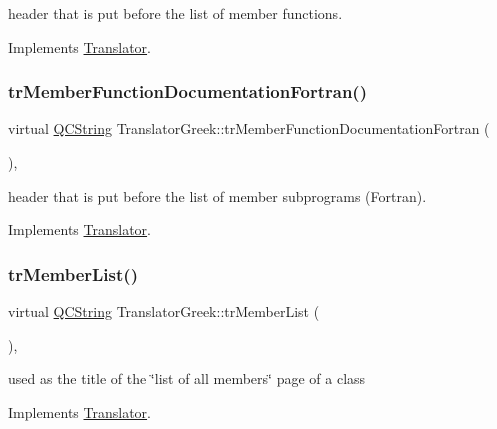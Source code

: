 header that is put before the list of member functions. 

Implements \mbox{\hyperlink{class_translator}{Translator}}.

\mbox{\label{class_translator_greek_a40aa92ad0e860be1ca884aedfcbc7af7}} 
\subsubsection{\texorpdfstring{trMemberFunctionDocumentationFortran()}{trMemberFunctionDocumentationFortran()}}
{\footnotesize\ttfamily virtual \mbox{\hyperlink{class_q_c_string}{Q\+C\+String}} Translator\+Greek\+::tr\+Member\+Function\+Documentation\+Fortran (\begin{DoxyParamCaption}{ }\end{DoxyParamCaption})\hspace{0.3cm}{\ttfamily [inline]}, {\ttfamily [virtual]}}

header that is put before the list of member subprograms (Fortran). 

Implements \mbox{\hyperlink{class_translator}{Translator}}.

\mbox{\label{class_translator_greek_a643d5a68f002a17ff0a0e8d977e301eb}} 
\subsubsection{\texorpdfstring{trMemberList()}{trMemberList()}}
{\footnotesize\ttfamily virtual \mbox{\hyperlink{class_q_c_string}{Q\+C\+String}} Translator\+Greek\+::tr\+Member\+List (\begin{DoxyParamCaption}{ }\end{DoxyParamCaption})\hspace{0.3cm}{\ttfamily [inline]}, {\ttfamily [virtual]}}

used as the title of the \char`\"{}list of all members\char`\"{} page of a class 

Implements \mbox{\hyperlink{class_translator}{Translator}}.

